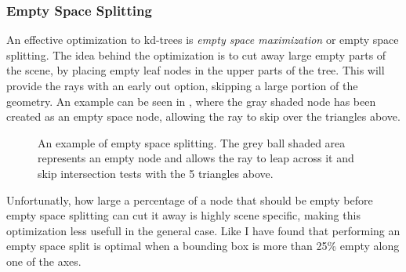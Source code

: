 \subsubsection{Empty Space Splitting}

An effective optimization to kd-trees is \textit{empty space
  maximization} or empty space splitting. The idea behind the
optimization is to cut away large empty parts of the scene, by placing
empty leaf nodes in the upper parts of the tree. This will provide the
rays with an early out option, skipping a large portion of the
geometry. An example can be seen in ,
where the gray shaded node has been created as an empty space node,
allowing the ray to skip over the triangles above.

\begin{figure}
  \centering

  \vspace{3mm}
  \parbox{6cm}{\caption[Empty Space Splitting.]{An example of empty
      space splitting. The grey ball shaded area represents an empty
      node and allows the ray to leap across it and skip intersection
      tests with the 5 triangles above.}\label{fig:emptySpaceExample}}
\end{figure}


Unfortunatly, how large a percentage of a node that should be empty
before empty space splitting can cut it away is highly scene specific,
making this optimization less usefull in the general case. Like \zhou{}
I have found that performing an empty space split is optimal when a
bounding box is more than 25\% empty along one of the axes.

